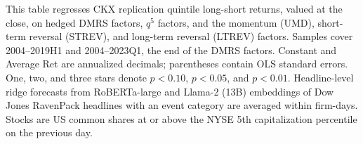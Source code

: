 \begin{table}[htbp]
\centering
\caption{CKX Replication: Factor Regressions of Portfolio Returns}
\label{tab:tabR5_ckx_alphas}
\begin{minipage}{\linewidth}\footnotesize
This table regresses CKX replication quintile long-short returns, valued at the close, on hedged DMRS factors, $q^5$ factors, and the momentum (UMD), short-term reversal (STREV), and long-term reversal (LTREV) factors. Samples cover 2004--2019H1 and 2004--2023Q1, the end of the DMRS factors. Constant and Average Ret are annualized decimals; parentheses contain OLS standard errors. One, two, and three stars denote $p<0.10$, $p<0.05$, and $p<0.01$. Headline-level ridge forecasts from RoBERTa-large and Llama-2 (13B) embeddings of Dow Jones RavenPack headlines with an event category are averaged within firm-days. Stocks are US common shares at or above the NYSE 5th capitalization percentile on the previous day.
\end{minipage}
\medskip


\end{table}
